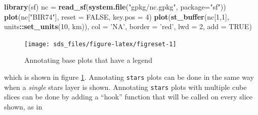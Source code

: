 \documentclass[]{book}
\newenvironment{Shaded}{\begin{snugshade}}{\end{snugshade}}
\newcommand{\CommentTok}[1]{\textcolor[rgb]{0.56,0.35,0.01}{\textit{#1}}}
\newcommand{\ControlFlowTok}[1]{\textcolor[rgb]{0.13,0.29,0.53}{\textbf{#1}}}
\newcommand{\DataTypeTok}[1]{\textcolor[rgb]{0.13,0.29,0.53}{#1}}
\newcommand{\DecValTok}[1]{\textcolor[rgb]{0.00,0.00,0.81}{#1}}
\newcommand{\KeywordTok}[1]{\textcolor[rgb]{0.13,0.29,0.53}{\textbf{#1}}}
\newcommand{\NormalTok}[1]{#1}
\newcommand{\OperatorTok}[1]{\textcolor[rgb]{0.81,0.36,0.00}{\textbf{#1}}}
\newcommand{\OtherTok}[1]{\textcolor[rgb]{0.56,0.35,0.01}{#1}}
\newcommand{\StringTok}[1]{\textcolor[rgb]{0.31,0.60,0.02}{#1}}
\begin{document}
\begin{Shaded}
\begin{Highlighting}[]
\KeywordTok{library}\NormalTok{(sf)}
\NormalTok{nc =}\StringTok{ }\KeywordTok{read_sf}\NormalTok{(}\KeywordTok{system.file}\NormalTok{(}\StringTok{"gpkg/nc.gpkg"}\NormalTok{, }\DataTypeTok{package=}\StringTok{"sf"}\NormalTok{))}
\KeywordTok{plot}\NormalTok{(nc[}\StringTok{"BIR74"}\NormalTok{], }\DataTypeTok{reset =} \OtherTok{FALSE}\NormalTok{, }\DataTypeTok{key.pos =} \DecValTok{4}\NormalTok{)}
\KeywordTok{plot}\NormalTok{(}\KeywordTok{st_buffer}\NormalTok{(nc[}\DecValTok{1}\NormalTok{,}\DecValTok{1}\NormalTok{], units}\OperatorTok{::}\KeywordTok{set_units}\NormalTok{(}\DecValTok{10}\NormalTok{, km)), }\DataTypeTok{col =} \StringTok{'NA'}\NormalTok{, }
     \DataTypeTok{border =} \StringTok{'red'}\NormalTok{, }\DataTypeTok{lwd =} \DecValTok{2}\NormalTok{, }\DataTypeTok{add =} \OtherTok{TRUE}\NormalTok{)}
\end{Highlighting}
\end{Shaded}

\begin{figure}

{\centering \texttt{[image: sds\_files/figure-latex/figreset-1]} 

}

\caption{Annotating base plots that have a legend}\label{fig:figreset}
\end{figure}

which is shown in figure \ref{fig:figreset}. Annotating \texttt{stars}
plots can be done in the same way when a \emph{single} stars layer is
shown. Annotating \texttt{stars} plots with multiple cube slices can be
done by adding a ``hook'' function that will be called on every slice
shown, as in

\begin{Shaded}
\end{Shaded}
\end{document}

